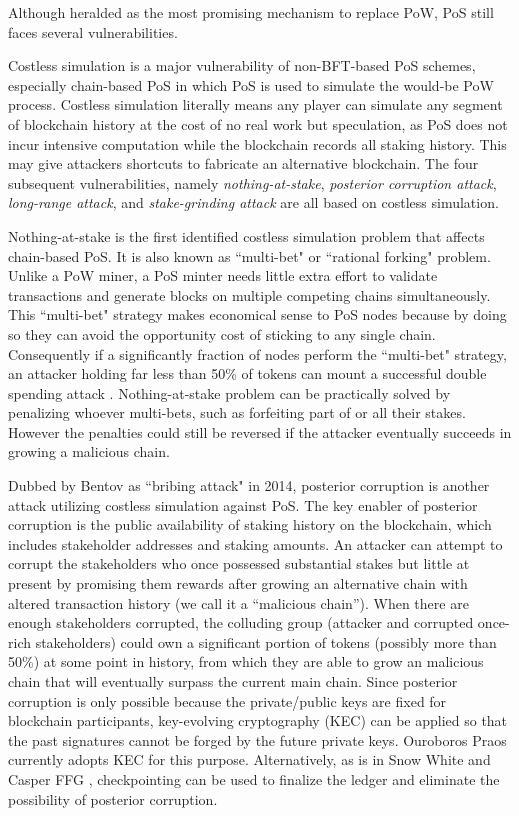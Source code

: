 \label{subsec:pos-vuln}
Although heralded as the most promising mechanism to replace PoW, PoS still faces several vulnerabilities.

Costless simulation is a major vulnerability of non-BFT-based PoS schemes, especially chain-based PoS in which PoS is used to simulate the would-be PoW process. Costless simulation literally means any player can simulate any segment of blockchain history at the cost of no real work but speculation, as PoS does not incur intensive computation while the blockchain records all staking history. This may give attackers shortcuts to fabricate an alternative blockchain. The four subsequent vulnerabilities, namely \textit{nothing-at-stake}, \textit{posterior corruption attack}, \textit{long-range attack}, and \textit{stake-grinding attack} are all based on costless simulation.

Nothing-at-stake is the first identified costless simulation problem that affects chain-based PoS. It is also known as ``multi-bet" or ``rational forking" problem. Unlike a PoW miner, a PoS minter needs little extra effort to validate transactions and generate blocks on multiple competing chains simultaneously. This ``multi-bet" strategy makes economical sense to PoS nodes because by doing so they can avoid the opportunity cost of sticking to any single chain. Consequently if a significantly fraction of nodes perform the ``multi-bet" strategy, an attacker holding far less than 50\% of tokens can mount a successful double spending attack . 
Nothing-at-stake problem can be practically solved by penalizing whoever multi-bets, such as forfeiting part of or all their stakes. However the penalties could still be reversed if the attacker eventually succeeds in growing a malicious chain.

Dubbed by Bentov  as ``bribing attack" in 2014, posterior corruption is another attack utilizing costless simulation against PoS. The key enabler of posterior corruption is the public availability of staking history on the blockchain, which includes stakeholder addresses and staking amounts.
An attacker can attempt to corrupt the stakeholders who once possessed substantial stakes but little at present by promising them rewards after growing an alternative chain with altered transaction history (we call it a ``malicious chain''). When there are enough stakeholders corrupted, the colluding group (attacker and corrupted once-rich stakeholders) could own a significant portion of tokens (possibly more than 50\%) at some point in history, from which they are able to grow an malicious chain that will eventually surpass the current main chain.
Since posterior corruption is only possible because the private/public keys are fixed for blockchain participants, key-evolving cryptography (KEC)  can be applied so that the past signatures cannot be forged by the future private keys. Ouroboros Praos  currently adopts KEC for this purpose.
Alternatively, as is in Snow White  and Casper FFG , checkpointing can be used to finalize the ledger and eliminate the possibility of posterior corruption.

